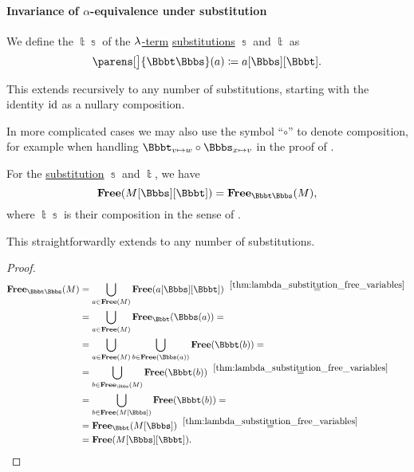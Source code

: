 \paragraph{Invariance of \( \alpha \)-equivalence under substitution}

\begin{definition}\label{def:lambda_substitution_composition}\mimprovised
  We define the  \( \Bbbt\Bbbs \) of the \hyperref[def:lambda_term]{\( {\mathrm \lambda} \)-term} \hyperref[def:lambda_term_substitution]{substitutions} \( \Bbbs \) and \( \Bbbt \) as
  \begin{equation}\label{eq:def:lambda_substitution_composition}
    \parens[\big]{ \Bbbt\Bbbs }(a) \coloneqq a[\Bbbs][\Bbbt].
  \end{equation}

  This extends recursively to any number of substitutions, starting with the identity \( \operatorname{id} \) as a nullary composition.
\end{definition}
\begin{comments}
  \item In more complicated cases we may also use the symbol \enquote{\( \circ \)} to denote composition, for example when handling \( \Bbbt_{v \mapsto w} \bincirc \Bbbs_{x \mapsto v} \) in the proof of .
\end{comments}

\begin{lemma}\label{thm:substitution_composition_free_variables}
  For the \hyperref[def:lambda_term_substitution]{substitution} \( \Bbbs \) and \( \Bbbt \), we have
  \begin{equation}\label{eq:thm:thm:substitution_composition_free_variables}
    \op*{Free}(M[\Bbbs][\Bbbt]) = \op*{Free}_{\Bbbt\Bbbs}(M),
  \end{equation}
  where \( \Bbbt\Bbbs \) is their composition in the sense of .

  This straightforwardly extends to any number of substitutions.
\end{lemma}
\begin{proof}
  \begin{align*}
    \op*{Free}_{\Bbbt\Bbbs}(M)
    &=
    \bigcup_{a \in \op*{Free}(M)} \op*{Free}(a[\Bbbs][\Bbbt])
    \reloset {\ref{thm:lambda_substitution_free_variables}} = \\ &=
    \bigcup_{a \in \op*{Free}(M)} \op*{Free}_\Bbbt(\Bbbs(a))
    = \\ &=
    \bigcup_{a \in \op*{Free}(M)} \bigcup_{b \in \op*{Free}(\Bbbs(a))} \op*{Free}(\Bbbt(b))
    = \\ &=
    \bigcup_{b \in \op*{Free}_\Bbbs(M)} \op*{Free}(\Bbbt(b))
    \reloset {\ref{thm:lambda_substitution_free_variables}} = \\ &=
    \bigcup_{b \in \op*{Free}(M[\Bbbs])} \op*{Free}(\Bbbt(b))
    = \\ &=
    \op*{Free}_\Bbbt(M[\Bbbs])
    \reloset {\ref{thm:lambda_substitution_free_variables}} = \\ &=
    \op*{Free}(M[\Bbbs][\Bbbt]).
  \end{align*}
\end{proof}


